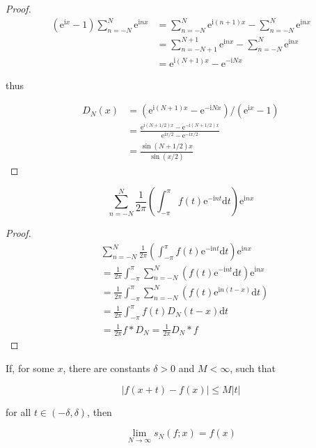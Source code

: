 \begin{proof}
    \begin{align*}
        (\mathrm{e}^{\mathrm{i} x} - 1)\sum_{n=-N}^{N} \mathrm{e}^{\mathrm{i} n x} &= \sum_{n=-N}^{N} \mathrm{e}^{\mathrm{i}(n+1) x} - \sum_{n=-N}^{N} \mathrm{e}^{\mathrm{i} n x} \\
        &= \sum_{n=-N+1}^{N+1} \mathrm{e}^{\mathrm{i} n x} - \sum_{n=-N}^{N} \mathrm{e}^{\mathrm{i} n x} \\
        &= \mathrm{e}^{\mathrm{i}(N+1)x} - \mathrm{e}^{- \mathrm{i}Nx}
    \end{align*}

    thus

    \begin{align*}
        D_N(x) &= (\mathrm{e}^{\mathrm{i}(N+1)x} - \mathrm{e}^{- \mathrm{i}Nx})/(\mathrm{e}^{\mathrm{i} x} - 1) \\
        &= \frac{\mathrm{e}^{\mathrm{i}(N+1/2)x} - \mathrm{e}^{- \mathrm{i}(N+1/2)x}}{\mathrm{e}^{\mathrm{i} x/2} - \mathrm{e}^{- \mathrm{i} x/2}} \\
        &= \frac{\sin (N+1/2)x}{\sin (x/2)}
    \end{align*}
\end{proof}

\begin{thm}
    \[
        \sum_{n=-N}^{N} \frac{1}{2\pi} \left(\int_{-\pi}^{\pi} f(t) \mathrm{e}^{- \mathrm{i}nt} \mathrm{d} t\right) \mathrm{e}^{\mathrm{i}nx}
    \]
\end{thm}

\begin{proof}
    \begin{align*}
        & \sum_{n=-N}^{N} \frac{1}{2\pi} \left(\int_{-\pi}^{\pi} f(t) \mathrm{e}^{- \mathrm{i}nt} \mathrm{d} t\right) \mathrm{e}^{\mathrm{i}nx} \\
        &=  \frac{1}{2\pi}\int_{-\pi}^{\pi} \sum_{n=-N}^{N}  \left( f(t) \mathrm{e}^{- \mathrm{i}nt} \mathrm{d} t\right) \mathrm{e}^{\mathrm{i}nx} \\
        &=  \frac{1}{2\pi}\int_{-\pi}^{\pi} \sum_{n=-N}^{N}  \left( f(t) \mathrm{e}^{\mathrm{i}n(t-x)} \mathrm{d} t\right)  \\
        &=  \frac{1}{2\pi}\int_{-\pi}^{\pi} f(t) D_N(t-x) \mathrm{d}t  \\
        &=  \frac{1}{2\pi} f \ast D_N = \frac{1}{2\pi} D_N \ast f
    \end{align*}
\end{proof}

\begin{thm}
    If, for some $x$, there are constants $\delta > 0$ and $M < \infty$,
    such that

    \[
        \left| f(x+t) - f(x) \right|\le M|t|
    \]

    for all $t \in (-\delta, \delta)$, then

    \[
        \lim_{N \to \infty} s_N(f; x) = f(x)
    \]
\end{thm}

